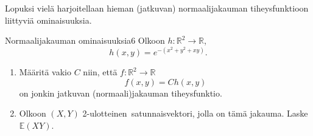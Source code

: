 \documentclass[11pt,a4paper]{amsart}
\newcommand{\R}{\mathbb{R}}
\newcommand{\E}{\mathbb{E}}
\newcommand{\1}{\mathbf{1}}
\begin{document}
Lopuksi vielä harjoitellaan hieman (jatkuvan) normaalijakauman tiheysfunktioon liittyviä ominaisuuksia.

\begin{Exercises}{Normaalijakauman ominaisuuksia}{6}
Olkoon $h:\R^2\to \R$, 
\[
h(x,y)=e^{-(x^2+y^2+xy)}.
\]
\begin{enumerate}
\item Määritä vakio $C$ niin, että $f:\R^2\to \R$
\[
f(x,y)=C h(x,y)
\]
on jonkin jatkuvan (normaali)jakauman tiheysfunktio.

\item Olkoon $(X,Y)$ 2-ulotteinen satunnaisvektori, jolla on tämä jakauma. Laske $\E(XY)$.

\end{enumerate}
\end{Exercises}
\end{document}
